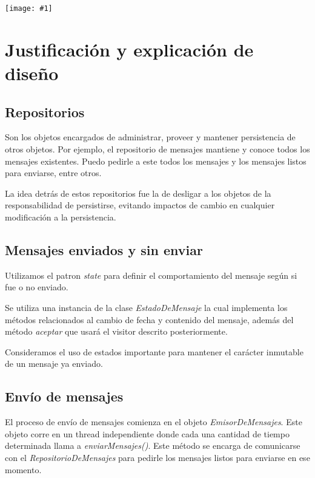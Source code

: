 \documentclass[a4paper, 10pt, twoside]{article}
\newcommand{\grafico}[1]{
  \begin{center}
    \texttt{[image: \#1]}
  \end{center}
}
\begin{document}
\grafico{diagramas/cursoDivisionTurno.pdf}

\newpage


\section{Justificación y explicación de diseño}

\subsection{Repositorios}
Son los objetos encargados de administrar, proveer y mantener persistencia de otros objetos. Por ejemplo,
el repositorio de mensajes mantiene y conoce todos los mensajes existentes. Puedo pedirle a este todos
los mensajes y  los mensajes listos para enviarse, entre otros.

La idea detrás de estos repositorios fue la de desligar a los objetos de la responsabilidad de persistirse,
evitando impactos de cambio en cualquier modificación a la persistencia.

\subsection{Mensajes enviados y sin enviar}
Utilizamos el patron \textit{state} para definir el comportamiento del mensaje según si fue o no enviado.

Se utiliza una instancia de la clase \textit{EstadoDeMensaje} la cual implementa los métodos relacionados al 
cambio de fecha y contenido del mensaje, además del método \textit{aceptar} que usará el visitor descrito 
posteriormente.

Consideramos el uso de estados importante para mantener el carácter inmutable de un mensaje ya enviado.

\subsection{Envío de mensajes}
El proceso de envío de mensajes comienza en el objeto \textit{EmisorDeMensajes}. 
Este objeto corre en un thread independiente donde cada una cantidad de tiempo determinada 
llama a \textit{enviarMensajes()}. Este método se encarga de comunicarse con el \textit{RepositorioDeMensajes}
para pedirle los mensajes listos para enviarse en ese momento.
\end{document}
